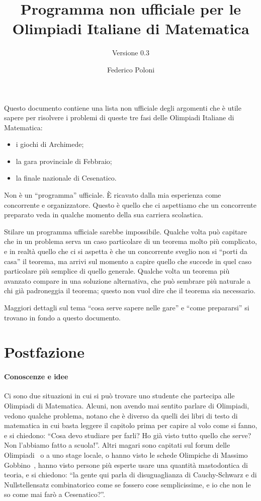 \documentclass[a4paper,10pt]{paper}
\date{}
\title{Programma non ufficiale per le Olimpiadi Italiane di Matematica}
\subtitle{Versione 0.3}
\author{Federico Poloni}
\begin{document}
 \maketitle
 
 Questo documento contiene una lista non ufficiale degli argomenti che è utile sapere per risolvere i problemi di queste tre fasi delle Olimpiadi Italiane di Matematica:
 \begin{itemize}
  \item i giochi di Archimede;
  \item la gara provinciale di Febbraio;
  \item la finale nazionale di Cesenatico.
 \end{itemize}

 Non è un ``programma'' ufficiale. È ricavato dalla mia esperienza come concorrente e organizzatore. Questo è quello che ci aspettiamo che un concorrente preparato veda in qualche momento della sua carriera scolastica.
 
 Stilare un programma ufficiale sarebbe impossibile. Qualche volta può capitare che in un problema serva un caso particolare di un teorema molto più complicato, e in realtà quello che ci si aspetta è che un concorrente sveglio non si ``porti da casa'' il teorema, ma arrivi sul momento a capire quello che succede in quel caso particolare più semplice di quello generale. Qualche volta un teorema più avanzato compare in una soluzione alternativa, che può sembrare più naturale a chi già padroneggia il teorema; questo non vuol dire che il teorema sia necessario.

 Maggiori dettagli sul tema ``cosa serve sapere nelle gare'' e ``come prepararsi'' si trovano in fondo a questo documento.
 
 
\section{Postfazione}
 
\paragraph{Conoscenze e idee} Ci sono due situazioni in cui si può trovare uno studente che partecipa alle Olimpiadi di Matematica. Alcuni, non avendo mai sentito parlare di Olimpiadi, vedono qualche problema, notano che è diverso da quelli dei libri di testo di matematica in cui basta leggere il capitolo prima per capire al volo come si fanno, e si chiedono: ``Cosa devo studiare per farli? Ho già visto tutto quello che serve? Non l'abbiamo fatto a scuola!''. Altri magari sono capitati sul forum delle Olimpiadi~\cite{oliforum} o a uno stage locale, o hanno visto le schede Olimpiche di Massimo Gobbino~\cite{schedeolimpiche}, hanno visto persone più esperte usare una quantità mastodontica di teoria, e si chiedono: ``la gente qui parla di disuguaglianza di Cauchy-Schwarz e di Nullstellensatz combinatorico come se fossero cose semplicissime, e io che non le so come mai farò  a Cesenatico?''.
 
\end{document}

